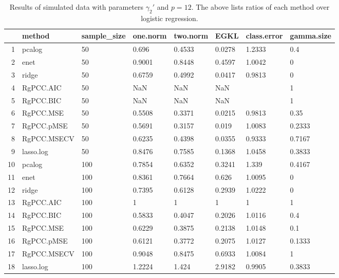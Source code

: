 \begin{table}[ht]
\centering
\begin{tabular}{rlllllll}
  \hline
 & method & sample\_size & one.norm & two.norm & EGKL & class.error & gamma.size \\ 
  \hline
1 & pcalog & 50 & 0.696 & 0.4533 & 0.0278 & 1.2333 & 0.4 \\ 
  2 & enet & 50 & 0.9001 & 0.8448 & 0.4597 & 1.0042 & 0 \\ 
  3 & ridge & 50 & 0.6759 & 0.4992 & 0.0417 & 0.9813 & 0 \\ 
  4 & RgPCC.AIC & 50 & NaN & NaN & NaN &  & 1 \\ 
  5 & RgPCC.BIC & 50 & NaN & NaN & NaN &  & 1 \\ 
  6 & RgPCC.MSE & 50 & 0.5508 & 0.3371 & 0.0215 & 0.9813 & 0.35 \\ 
  7 & RgPCC.pMSE & 50 & 0.5691 & 0.3157 & 0.019 & 1.0083 & 0.2333 \\ 
  8 & RgPCC.MSECV & 50 & 0.6235 & 0.4398 & 0.0355 & 0.9333 & 0.7167 \\ 
  9 & lasso.log & 50 & 0.8476 & 0.7585 & 0.1368 & 1.0458 & 0.3833 \\ 
  10 & pcalog & 100 & 0.7854 & 0.6352 & 0.3241 & 1.339 & 0.4167 \\ 
  11 & enet & 100 & 0.8361 & 0.7664 & 0.626 & 1.0095 & 0 \\ 
  12 & ridge & 100 & 0.7395 & 0.6128 & 0.2939 & 1.0222 & 0 \\ 
  13 & RgPCC.AIC & 100 & 1 & 1 & 1 & 1 & 1 \\ 
  14 & RgPCC.BIC & 100 & 0.5833 & 0.4047 & 0.2026 & 1.0116 & 0.4 \\ 
  15 & RgPCC.MSE & 100 & 0.6229 & 0.3875 & 0.2138 & 1.0148 & 0.1 \\ 
  16 & RgPCC.pMSE & 100 & 0.6121 & 0.3772 & 0.2075 & 1.0127 & 0.1333 \\ 
  17 & RgPCC.MSECV & 100 & 0.9048 & 0.8475 & 0.6933 & 1.0084 & 1 \\ 
  18 & lasso.log & 100 & 1.2224 & 1.424 & 2.9182 & 0.9905 & 0.3833 \\ 
   \hline
\end{tabular}
\caption{Results of simulated data with parameters $\gamma_2'$ and $p =12$. The above lists ratios of each method over logistic regression.} 
\label{fig-2'-nonlead-new-algo-12-metrics-pratio}
\end{table}
